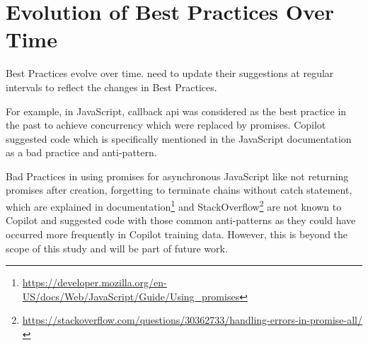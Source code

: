 \section{Evolution of Best Practices Over Time}
\label{evolution}
Best Practices evolve over time. \cct{} need to update their suggestions at regular intervals to reflect the changes in Best Practices. 

For example, in JavaScript, callback api was considered as the best practice in the past to achieve concurrency which were replaced by promises. Copilot suggested code which is specifically mentioned in the JavaScript documentation as a bad practice and anti-pattern.

Bad Practices in using promises for asynchronous JavaScript like not returning promises after creation, forgetting to terminate chains without catch statement, which are explained in documentation\footnote{\label{docs}\url{https://developer.mozilla.org/en-US/docs/Web/JavaScript/Guide/Using_promises}} and StackOverflow\footnote{\url{https://stackoverflow.com/questions/30362733/handling-errors-in-promise-all/}} are not known to Copilot and suggested code with those common anti-patterns as they could have occurred more frequently in Copilot training data. However, this is beyond the scope of this study and will be part of future work.